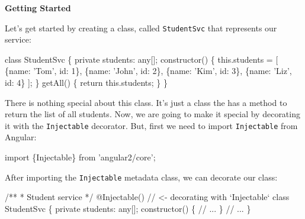 \documentclass[12pt,]{article}
\newenvironment{Shaded}{}{}
\newcommand{\KeywordTok}[1]{\textcolor[rgb]{0.00,0.00,1.00}{{#1}}}
\newcommand{\DecValTok}[1]{{#1}}
\newcommand{\CommentTok}[1]{\textcolor[rgb]{0.00,0.50,0.00}{{#1}}}
\newcommand{\FunctionTok}[1]{{#1}}
\newcommand{\NormalTok}[1]{{#1}}
\begin{document}
\textbf{Getting Started}

Let's get started by creating a class, called \texttt{StudentSvc} that
represents our service:

\begin{Shaded}
\begin{Highlighting}[numbers=left,,]
\KeywordTok{class} \NormalTok{StudentSvc \{}
  \KeywordTok{private} \NormalTok{students: any[];}
  \FunctionTok{constructor}\NormalTok{() \{}
    \KeywordTok{this}\NormalTok{.}\FunctionTok{students} \NormalTok{= [}
      \NormalTok{\{name: 'Tom', id: }\DecValTok{1}\NormalTok{\},}
      \NormalTok{\{name: 'John', id: }\DecValTok{2}\NormalTok{\},}
      \NormalTok{\{name: 'Kim', id: }\DecValTok{3}\NormalTok{\},}
      \NormalTok{\{name: 'Liz', id: }\DecValTok{4}\NormalTok{\}}
    \NormalTok{];}
  \NormalTok{\}}
  \FunctionTok{getAll}\NormalTok{() \{}
    \KeywordTok{return} \KeywordTok{this}\NormalTok{.}\FunctionTok{students}\NormalTok{;}
  \NormalTok{\}}
\NormalTok{\}}
\end{Highlighting}
\end{Shaded}

There is nothing special about this class. It's just a class the has a
method to return the list of all students. Now, we are going to make it
special by decorating it with the \texttt{Injectable} decorator. But,
first we need to import \texttt{Injectable} from Angular:

\begin{Shaded}
\begin{Highlighting}[numbers=left,,]
\KeywordTok{import \{Injectable\} from 'angular2/core';}
\end{Highlighting}
\end{Shaded}

After importing the \texttt{Injectable} metadata class, we can decorate
our class:

\begin{Shaded}
\begin{Highlighting}[numbers=left,,]
\CommentTok{/**}
\CommentTok{ * Student service}
\CommentTok{ */}
\FunctionTok{@Injectable}\NormalTok{() }\CommentTok{// <- decorating with `Injectable`}
\KeywordTok{class} \NormalTok{StudentSvc \{}
  \KeywordTok{private} \NormalTok{students: any[];}
  \FunctionTok{constructor}\NormalTok{() \{}
   \CommentTok{// ...}
  \NormalTok{\}}
  \CommentTok{// ...}
\NormalTok{\}}
\end{Highlighting}
\end{Shaded}
\end{document}
